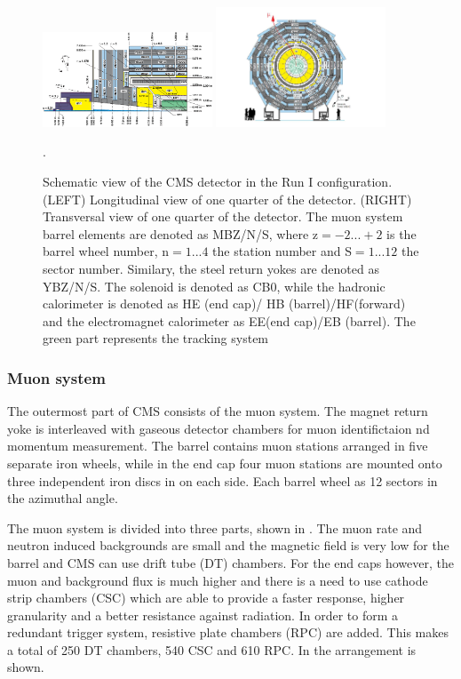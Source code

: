 \begin{figure}[ht!]
	\centering
	\includegraphics[width=0.45\textwidth]{2_ExperimentalSetup/Figures/cmsview1}
	\includegraphics[width=0.45\textwidth]{2_ExperimentalSetup/Figures/cmsview}
 \caption{Schematic view of the CMS detector in the Run I configuration. (LEFT) Longitudinal view of one quarter of the detector. (RIGHT)  Transversal view of one quarter of the detector. The muon system barrel elements are denoted as MBZ/N/S, where z$=-2...+2$ is the barrel wheel number, n$=1...4$ the station number and S$=1...12$ the sector number. Similary, the steel return yokes are denoted as YBZ/N/S. The solenoid is denoted as CB0, while the hadronic calorimeter is denoted as HE (end cap)/ HB (barrel)/HF(forward) and the electromagnet calorimeter as EE(end cap)/EB (barrel). The green part represents the tracking system\cite{Chatrchyan:1223944}}.
	\label{fig:CMSview}
\end{figure}

\subsubsection{Muon system}
The outermost part of CMS consists of the muon system. The magnet return yoke is interleaved with gaseous detector chambers for muon identifictaion nd momentum measurement. The barrel contains muon stations arranged in five separate iron wheels, while in the end cap four muon stations are mounted onto three independent iron discs in on each side. Each barrel wheel as 12 sectors in the azimuthal angle. 

The muon system is divided into three parts\cite{Chatrchyan:1223944}, shown in . The muon rate and neutron induced backgrounds are small and the magnetic field is very low for the barrel and CMS can use drift tube (DT) chambers. For the end caps however, the muon and background flux is much higher and there is a need to use cathode strip chambers (CSC) which are able to provide a faster response, higher granularity and a better resistance against radiation. In order to form a redundant trigger system, resistive plate chambers (RPC) are added. This makes a total of 250 DT chambers, 540 CSC and 610 RPC. In  the arrangement is shown.



